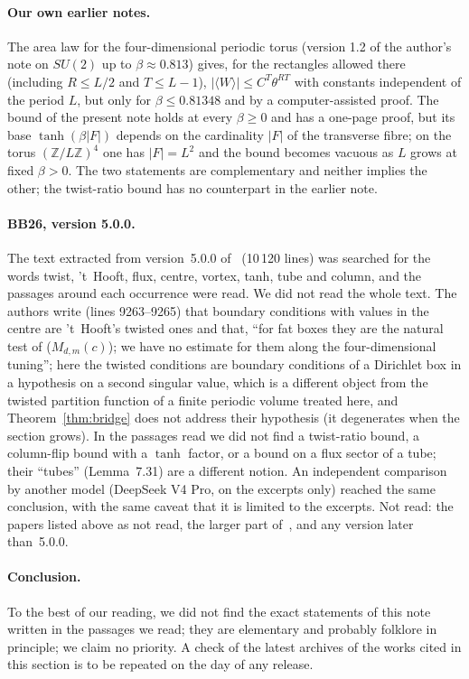 \documentclass[11pt,a4paper]{article}
\theoremstyle{plain}
\theoremstyle{definition}
\theoremstyle{remark}
\numberwithin{equation}{section}
\newcommand{\Z}{\mathbb{Z}}
\begin{document}
\paragraph{Our own earlier notes.} The area law for the four-dimensional periodic torus (version 1.2 of the author's note on $SU(2)$ up to $\beta\approx0.813$) gives, for the rectangles allowed there (including $R\le L/2$ and $T\le L-1$), $|\langle W\rangle|\le C^T\theta^{RT}$ with constants independent of the period $L$, but only for $\beta\le0.81348$ and by a computer-assisted proof. The bound of the present note holds at every $\beta\ge0$ and has a one-page proof, but its base $\tanh(\beta|F|)$ depends on the cardinality $|F|$ of the transverse fibre; on the torus $(\Z/L\Z)^4$ one has $|F|=L^2$ and the bound becomes vacuous as $L$ grows at fixed $\beta>0$. The two statements are complementary and neither implies the other; the twist-ratio bound has no counterpart in the earlier note.

\paragraph{BB26, version 5.0.0.} The text extracted from version~5.0.0 of~\cite{BB26} (10\,120 lines) was searched for the words twist, 't~Hooft, flux, centre, vortex, tanh, tube and column, and the passages around each occurrence were read. We did not read the whole text. The authors write (lines 9263--9265) that boundary conditions with values in the centre are 't~Hooft's twisted ones and that, ``for fat boxes they are the natural test of ($M_{d,m}(c)$); we have no estimate for them along the four-dimensional tuning''; here the twisted conditions are boundary conditions of a Dirichlet box in a hypothesis on a second singular value, which is a different object from the twisted partition function of a finite periodic volume treated here, and Theorem~\ref{thm:bridge} does not address their hypothesis (it degenerates when the section grows). In the passages read we did not find a twist-ratio bound, a column-flip bound with a $\tanh$ factor, or a bound on a flux sector of a tube; their ``tubes'' (Lemma~7.31) are a different notion. An independent comparison by another model (DeepSeek V4 Pro, on the excerpts only) reached the same conclusion, with the same caveat that it is limited to the excerpts. Not read: the papers listed above as not read, the larger part of~\cite{BB26}, and any version later than~5.0.0.

\paragraph{Conclusion.} To the best of our reading, we did not find the exact statements of this note written in the passages we read; they are elementary and probably folklore in principle; we claim no priority. A check of the latest archives of the works cited in this section is to be repeated on the day of any release.
\end{document}
